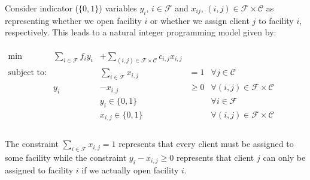 \documentclass[11pt]{article}
\newcommand{\scf}{\ensuremath{\mathcal{F}}\xspace}
\newcommand{\scc}{\ensuremath{\mathcal{C}}\xspace}
\begin{document}
Consider indicator ($\{0,1\}$) variables $y_i$, $i\in \scf$ and
$x_{ij}$, $(i,j)\in \scf\times\scc$ as representing whether we open
facility $i$ or whether we assign client $j$ to facility $i$,
respectively. This leads to a natural integer programming model
given by:\\
\\
$\begin{array}{lrrll} \min & \sum_{i\in\scf} f_iy_i& +
\sum_{(i,j)\in\scf\times\scc}c_{i,j}x_{i,j}&&\\
\mbox{subject to:}& &\sum_{i\in\scf} x_{i,j}&=1&\forall j\in\scc\\
& y_i & -x_{i,j}&\geq 0 & \forall (i,j)\in\scf\times\scc\\
& &y_i\in\{0,1\}&& \forall i\in\scf\\
& &x_{i,j} \in\{0,1\} && \forall (i,j)\in\scf\times\scc\\
\end{array}$\\
\\
The constraint $\sum_{i\in\scf} x_{i,j}=1$ represents that every
client must be assigned to some facility while the constraint $y_i
-x_{i,j}\geq 0$ represents that client $j$ can only be assigned to
facility $i$ if we actually open facility $i$.
\end{document}
